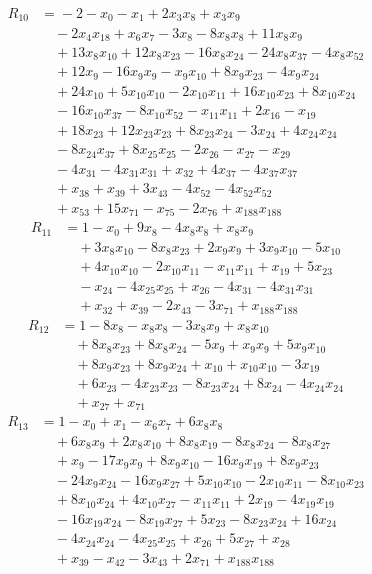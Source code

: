\begin{align*}
R_{10}&={}-2 -x_{0} -x_{1} +2x_{3}x_{8} +x_{3}x_{9}\\
&\quad{}-2x_{4}x_{18} +x_{6}x_{7} -3x_{8} -8x_{8}x_{8} +11x_{8}x_{9}\\
&\quad{}+13x_{8}x_{10} +12x_{8}x_{23} -16x_{8}x_{24} -24x_{8}x_{37} -4x_{8}x_{52}\\
&\quad{}+12x_{9} -16x_{9}x_{9} -x_{9}x_{10} +8x_{9}x_{23} -4x_{9}x_{24}\\
&\quad{}+24x_{10} +5x_{10}x_{10} -2x_{10}x_{11} +16x_{10}x_{23} +8x_{10}x_{24}\\
&\quad{}-16x_{10}x_{37} -8x_{10}x_{52} -x_{11}x_{11} +2x_{16} -x_{19}\\
&\quad{}+18x_{23} +12x_{23}x_{23} +8x_{23}x_{24} -3x_{24} +4x_{24}x_{24}\\
&\quad{}-8x_{24}x_{37} +8x_{25}x_{25} -2x_{26} -x_{27} -x_{29}\\
&\quad{}-4x_{31} -4x_{31}x_{31} +x_{32} +4x_{37} -4x_{37}x_{37}\\
&\quad{}+x_{38} +x_{39} +3x_{43} -4x_{52} -4x_{52}x_{52}\\
&\quad{}+x_{53} +15x_{71} -x_{75} -2x_{76} +x_{188}x_{188}
\end{align*}
\begin{align*}
R_{11}&={}1 -x_{0} +9x_{8} -4x_{8}x_{8} +x_{8}x_{9}\\
&\quad{}+3x_{8}x_{10} -8x_{8}x_{23} +2x_{9}x_{9} +3x_{9}x_{10} -5x_{10}\\
&\quad{}+4x_{10}x_{10} -2x_{10}x_{11} -x_{11}x_{11} +x_{19} +5x_{23}\\
&\quad{}-x_{24} -4x_{25}x_{25} +x_{26} -4x_{31} -4x_{31}x_{31}\\
&\quad{}+x_{32} +x_{39} -2x_{43} -3x_{71} +x_{188}x_{188}
\end{align*}
\begin{align*}
R_{12}&={}1 -8x_{8} -x_{8}x_{8} -3x_{8}x_{9} +x_{8}x_{10}\\
&\quad{}+8x_{8}x_{23} +8x_{8}x_{24} -5x_{9} +x_{9}x_{9} +5x_{9}x_{10}\\
&\quad{}+8x_{9}x_{23} +8x_{9}x_{24} +x_{10} +x_{10}x_{10} -3x_{19}\\
&\quad{}+6x_{23} -4x_{23}x_{23} -8x_{23}x_{24} +8x_{24} -4x_{24}x_{24}\\
&\quad{}+x_{27} +x_{71}
\end{align*}
\begin{align*}
R_{13}&={}1 -x_{0} +x_{1} -x_{6}x_{7} +6x_{8}x_{8}\\
&\quad{}+6x_{8}x_{9} +2x_{8}x_{10} +8x_{8}x_{19} -8x_{8}x_{24} -8x_{8}x_{27}\\
&\quad{}+x_{9} -17x_{9}x_{9} +8x_{9}x_{10} -16x_{9}x_{19} +8x_{9}x_{23}\\
&\quad{}-24x_{9}x_{24} -16x_{9}x_{27} +5x_{10}x_{10} -2x_{10}x_{11} -8x_{10}x_{23}\\
&\quad{}+8x_{10}x_{24} +4x_{10}x_{27} -x_{11}x_{11} +2x_{19} -4x_{19}x_{19}\\
&\quad{}-16x_{19}x_{24} -8x_{19}x_{27} +5x_{23} -8x_{23}x_{24} +16x_{24}\\
&\quad{}-4x_{24}x_{24} -4x_{25}x_{25} +x_{26} +5x_{27} +x_{28}\\
&\quad{}+x_{39} -x_{42} -3x_{43} +2x_{71} +x_{188}x_{188}
\end{align*}

